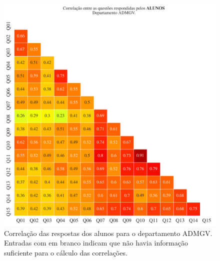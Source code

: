 \documentclass[a4paper,10pt]{article}
\begin{document}
\begin{figure}[h]
\centering
\includegraphics[width=0.999\linewidth]{matriz_corr__ADMGV_alunos.png}
\caption{\label{fig:corr_alunos}Correlação das respostas dos alunos para o departamento ADMGV. Entradas com em branco indicam que não havia informação suficiente para o cálculo das correlações.}
\end{figure}
\end{document}
